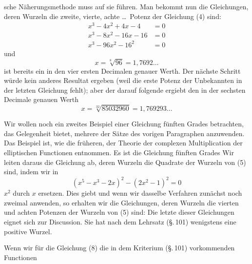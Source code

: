 sche Näherungsmethode muss auf sie führen. Man bekommt nun die Gleichungen, deren Wurzeln die zweite, vierte, achte \ldots\ Potenz der Gleichung (4) sind:
\[
\begin{aligned}
x^3 - 4x^2 + 4x - 4 &= 0 \\
x^3 - 8x^2 - 16x - 16 &= 0 \\
x^3 - 96x^2 - 16^2 &= 0
\end{aligned}
\]
und
\[
x = \sqrt[8]{96} = 1{,}7692\ldots
\]
ist bereits ein in den vier ersten Decimalen genauer Werth. Der nächste Schritt würde kein anderes Resultat ergeben (weil die erste Potenz der Unbekannten in der letzten Gleichung fehlt); aber der darauf folgende ergiebt den in der sechsten Decimale genauen Werth
\[
x = \sqrt[32]{85032960} = 1{,}769293\ldots
\]

Wir wollen noch ein zweites Beispiel einer Gleichung fünften Grades betrachten, das Gelegenheit bietet, mehrere der Sätze des vorigen Paragraphen anzuwenden. Das Beispiel ist, wie die früheren, der Theorie der complexen Multiplication der elliptischen Functionen entnommen. Es ist die Gleichung fünften Grades
Wir leiten daraus die Gleichung ab, deren Wurzeln die Quadrate der Wurzeln von (5) sind, indem wir in
\[
(x^5 - x^3 - 2x)^2 - (2x^2 - 1)^2 = 0
\]
$x^2$ durch $x$ ersetzen. Dies giebt
und wenn wir dasselbe Verfahren zunächst noch zweimal anwenden, so erhalten wir die Gleichungen, deren Wurzeln die vierten und achten Potenzen der Wurzeln von (5) sind:
Die letzte dieser Gleichungen eignet sich zur Discussion. Sie hat nach dem  Lehrsatz (\S.\,101) wenigstens eine positive Wurzel.

Wenn wir für die Gleichung (8) die in dem  Kriterium (\S.\,101) vorkommenden Functionen
